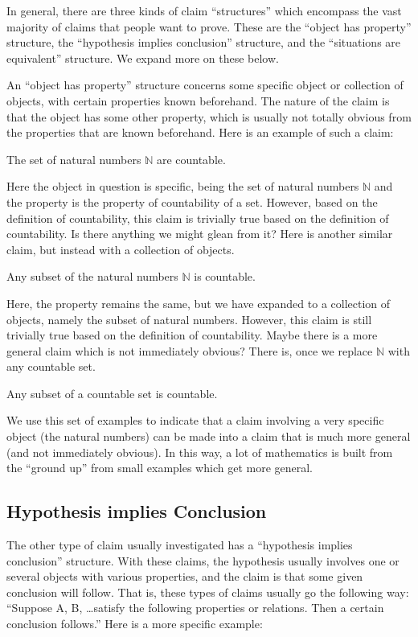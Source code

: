 In general, there are three kinds of claim ``structures'' which encompass the vast majority of claims that people want to prove. These are the ``object has property'' structure, the ``hypothesis implies conclusion'' structure, and the ``situations are equivalent'' structure. We expand more on these below.

An ``object has property'' structure concerns some specific object or collection of objects, with certain properties known beforehand. The nature of the claim is that the object has some other property, which is usually not totally obvious from the properties that are known beforehand. Here is an example of such a claim:
\begin{proposition}
The set of natural numbers $\mathbb{N}$ are countable.
\end{proposition}
Here the object in question is specific, being the set of natural numbers $\mathbb{N}$ and the property is the property of countability of a set. However, based on the definition of countability, this claim is trivially true based on the definition of countability. Is there anything we might glean from it? Here is another similar claim, but instead with a collection of objects.
\begin{proposition}
Any subset of the natural numbers $\mathbb{N}$ is countable.
\end{proposition}
Here, the property remains the same, but we have expanded to a collection of objects, namely the subset of natural numbers. However, this claim is still trivially true based on the definition of countability. Maybe there is a more general claim which is not immediately obvious? There is, once we replace $\mathbb{N}$ with any countable set.
\begin{proposition}
Any subset of a countable set is countable.
\end{proposition}
We use this set of examples to indicate that a claim involving a very specific object (the natural numbers) can be made into a claim that is much more general (and not immediately obvious). In this way, a lot of mathematics is built from the ``ground up'' from small examples which get more general.

\subsection{Hypothesis implies Conclusion}

The other type of claim usually investigated has a ``hypothesis implies conclusion'' structure. With these claims, the hypothesis usually involves one or several objects with various properties, and the claim is that some given conclusion will follow. That is, these types of claims usually go the following way: ``Suppose A, B, \ldots satisfy the following properties or relations. Then a certain conclusion follows.'' Here is a more specific example:

